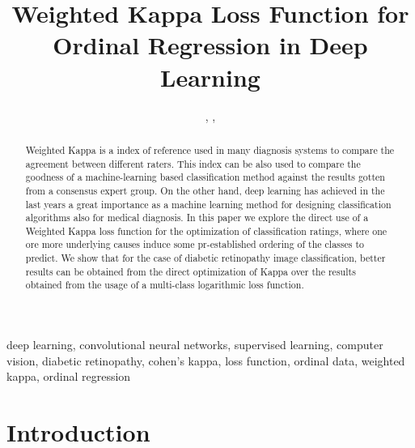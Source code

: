 \documentclass{IOS-Book-Article}
\begin{document}
\pagestyle{headings}
\def\thepage{}
\begin{frontmatter}                            %

\title{Weighted Kappa Loss Function for Ordinal Regression in Deep Learning
}

\author{ ,  ,  }

\address{Departament d'Enginyeria Inform\`{a}tica i Matem\`{a}tiques\\ Universitat Rovira i Virgili, Tarragona}



\begin{abstract}
Weighted Kappa is a index of reference used in many diagnosis systems to compare the agreement between different raters. This index can be also used to compare the goodness of a machine-learning based classification method against the results gotten from a consensus expert group. On the other hand, deep learning has achieved in the last years a great importance as a machine learning method for designing classification algorithms also for medical diagnosis. In this paper we explore the direct use of a Weighted Kappa loss function for the optimization of classification ratings, where one ore more underlying causes induce some pr-established ordering of the classes to predict. We show that for the case of diabetic retinopathy image classification, better results can be obtained from the direct optimization of Kappa over the results obtained from the usage of a multi-class logarithmic loss function.
\end{abstract}

\begin{keyword}
deep learning, convolutional neural networks, supervised learning, computer vision, diabetic retinopathy, cohen's kappa, loss function, ordinal data, weighted kappa, ordinal regression
\end{keyword}
\end{frontmatter}

\thispagestyle{empty}
\pagestyle{empty}

\section{Introduction}
\end{document}
